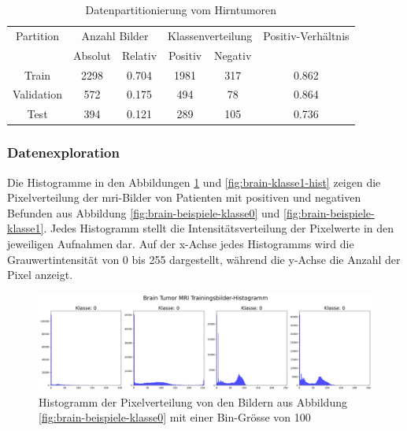 \begin{table}[H]
    \centering
    \begin{tabular}{@{}cccccc@{}}
        \toprule
        Partition & \multicolumn{2}{c}{Anzahl Bilder} & \multicolumn{2}{c}{Klassenverteilung} & Positiv-Verhältnis\\ 
        \cmidrule(lr){2-3} \cmidrule(lr){4-5} 
                   & Absolut & Relativ & Positiv & Negativ  \\ 
        \midrule
        Train      & 2298 & 0.704 & 1981 & 317 & 0.862      \\
        Validation & 572  & 0.175 & 494  & 78  & 0.864      \\
        Test       & 394  & 0.121 & 289  & 105 & 0.736      \\ 
        \bottomrule
    \end{tabular}
    \caption{Datenpartitionierung vom Hirntumoren}
    \label{tab:brain-binaere-klassenverteilung}
\end{table}

\newpage

\subsubsection{Datenexploration} \label{chap:brain-eda}
Die Histogramme in den Abbildungen \ref{fig:brain-klasse0-hist} und \ref{fig:brain-klasse1-hist} zeigen die Pixelverteilung der \acrshort{mri}-Bilder von Patienten mit positiven und negativen Befunden aus Abbildung \ref{fig:brain-beispiele-klasse0} und \ref{fig:brain-beispiele-klasse1}. Jedes Histogramm stellt die Intensitätsverteilung der Pixelwerte in den jeweiligen Aufnahmen dar. Auf der x-Achse jedes Histogramms wird die Grauwertintensität von 0 bis 255 dargestellt, während die y-Achse die Anzahl der Pixel anzeigt. 

\begin{figure}[H]
    \centering
    \includegraphics[width=\linewidth]{01-images/03-data/brain-klasse0-hist.png}
    \caption{Histogramm der Pixelverteilung von den Bildern aus Abbildung \ref{fig:brain-beispiele-klasse0} mit einer Bin-Grösse von 100}
    \label{fig:brain-klasse0-hist}
\end{figure}

